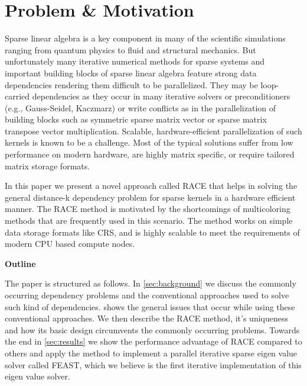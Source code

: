 	
\section{Problem \& Motivation}
	Sparse linear algebra is a key component in many of the scientific simulations
	ranging from quantum physics to fluid and structural mechanics.
	But unfortunately many iterative numerical methods for sparse systems 
	and important building 	blocks of sparse linear algebra feature strong 
	data dependencies rendering them difficult to be parallelized.
	They may be	loop-carried dependencies as they occur in
	many iterative solvers or preconditioners (e.g., Gauss-Seidel, Kaczmarz) 
	or write conflicts as in the parallelization of building blocks such 
	as symmetric sparse matrix vector or sparse matrix transpose vector multiplication.
	Scalable, hardware-efficient parallelization of such kernels is known to be a 
	challenge. Most of the typical solutions suffer from low performance
	on modern hardware, are highly matrix specific, or require tailored
    matrix storage formats.

	In this paper we present a novel approach called \acrshort{RACE} that helps in
	solving the general distance-k dependency problem for sparse kernels in a
	hardware efficient manner. The \acrshort{RACE} method is motivated by the
	shortcomings of multicoloring methods that are frequently used in this scenario.
	The method works on simple data storage formats
	like \acrfull{CRS}, and is highly scalable to meet the requirements of 
	modern CPU based compute nodes. \medskip

\noindent\textbf{Outline}


\noindent	The paper is structured as follows. In \cref{sec:background} we discuss
	the commonly occurring dependency problems and the conventional
	approaches used to solve such kind of dependencies.  
	shows the general issues that occur while using these conventional
	approaches. We then describe the \acrshort{RACE} method, it's uniqueness
	and how its	basic design circumvents the commonly occurring problems. 
	Towards the end	in \cref{sec:results} we show the performance advantage
	of \acrshort{RACE} compared to others and apply the method to implement
	a parallel iterative sparse eigen value solver called FEAST, which we 
	believe is the first iterative implementation of this eigen value solver.
	

